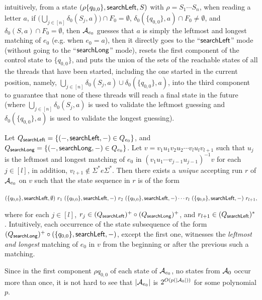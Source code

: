 \begin{itemize}
\begin{itemize}
		\medskip
		intuitively, from a state $(\rho \{q_{0,0}\}, \mathsf{searchLeft}, S)$ with $\rho = S_1 \cdots S_n$, when reading a letter $a$, if $\big(\bigcup \limits_{j \in [n]} \delta_0(S_j, a) \big) \cap F_0 = \emptyset$, $\delta_0(\{q_{0,0}\}, a) \cap F_0 \neq \emptyset$, and $\delta_0(S,a) \cap F_0 = \emptyset$, then $\mathcal{A}_{e_0}$  guesses that $a$ is simply the leftmost and longest matching of $e_0$ (e.g. when $e_0= a$), then it directly goes to the ``$\mathsf{searchLeft}$'' mode (without going to the ``$\mathsf{searchLong}$'' mode), resets the first component of the control state to $\{q_{0,0}\}$, and puts the union of the sets of the reachable states of all the threads that have been started, including the one started in the current position, namely, $\bigcup \limits_{j \in [n]} \delta_0(S_j, a) \cup \delta_0(\{q_{0,0}\}, a)$, into the third component to  guarantee that none of these threads will reach a final state in the future (where $\bigcup \limits_{j \in [n]} \delta_0(S_j, a)$ is used to validate the leftmost guessing and $\delta_0(\{q_{0,0}\}, a)$ is used to validate the longest guessing).
	\end{itemize}
\end{itemize}

Let $Q_{\mathsf{searchLeft}}  = \{ (-, \mathsf{searchLeft}, -) \in Q_{e_0} \}$,  and $Q_{\mathsf{searchLong}} = \{ (-, \mathsf{searchLong}, -)  \in Q_{e_0}\}$.
Let $v = v_1 u_1 v_2 u_2 \cdots v_l u_l v_{l+1}$ such that $u_j$ is the leftmost and longest matching of $e_0$ in $(v_1 u_1 \cdots v_{j-1} u_{j-1})^{-1} v$ for each $j \in [l]$, in addition, $v_{l+1} \not \in \Sigma^\ast e \Sigma^\ast$. Then there exists a \emph{unique} accepting run $r$ of $\mathcal{A}_{e_0}$ on $v$ such that the state sequence in $r$ is of the form 

\medskip
{\small
$
(\{q_{0,0}\}, \mathsf{searchLeft}, \emptyset)\ r_1\ ( \{q_{0,0}\}, \mathsf{searchLeft}, -) \ r_2\ ( \{q_{0,0}\}, \mathsf{searchLeft}, -)
\cdots r_l\ ( \{q_{0,0}\}, \mathsf{searchLeft}, -)\ r_{l+1},
$
}
\medskip

where for each $j \in [l]$, $r_j \in (Q_{\mathsf{searchLeft}})^+ \circ (Q_{\mathsf{searchLong}})^+$, and $r_{l+1} \in (Q_{\mathsf{searchLeft}})^*$. Intuitively, each occurrence of the state subsequence of the form $(Q_{\mathsf{searchLong}})^+ \circ (\{q_{0,0}\}, \mathsf{searchLeft},-)$, except the first one, witnesses the \emph{leftmost and longest} matching of $e_0$ in $v$ from the beginning or after the previous such a matching.

Since in the first component $\rho q_{0,0}$ of each state of $\mathcal{A}_{e_0}$, no states from $\mathcal{A}_0$ occur more than once,  it is not hard to see that $|\mathcal{A}_{e_0}|$ is $2^{O(p(|\mathcal{A}_0|))}$ for some polynomial $p$. 

